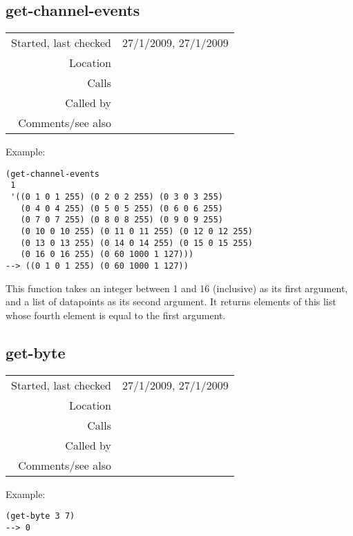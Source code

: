 \subsection*{get-channel-events}\label{fun:get-channel-events}

\vspace{0.3cm}
\begin{tabular}{r|p{8cm}}
Started, last checked & 27/1/2009, 27/1/2009 \\
Location & \nameref{sec:MIDI-export} \\
Calls & \\
Called by & \nameref{fun:create-midi-tracks} \\
Comments/see also &
\end{tabular}

\vspace{0.5cm}
\noindent Example:
\begin{verbatim}
(get-channel-events
 1
 '((0 1 0 1 255) (0 2 0 2 255) (0 3 0 3 255)
   (0 4 0 4 255) (0 5 0 5 255) (0 6 0 6 255) 
   (0 7 0 7 255) (0 8 0 8 255) (0 9 0 9 255)
   (0 10 0 10 255) (0 11 0 11 255) (0 12 0 12 255)
   (0 13 0 13 255) (0 14 0 14 255) (0 15 0 15 255)
   (0 16 0 16 255) (0 60 1000 1 127)))
--> ((0 1 0 1 255) (0 60 1000 1 127))
\end{verbatim}

\noindent This function takes an integer between 1 and
16 (inclusive) as its first argument, and a list of
datapoints as its second argument. It returns elements
of this list whose fourth element is equal to the
first argument.


\subsection*{get-byte}\label{fun:get-byte}

\vspace{0.3cm}
\begin{tabular}{r|p{8cm}}
Started, last checked & 27/1/2009, 27/1/2009 \\
Location & \nameref{sec:MIDI-export} \\
Calls & \\
Called by & \nameref{fun:split-bytes} \\
Comments/see also &
\end{tabular}

\vspace{0.5cm}
\noindent Example:
\begin{verbatim}
(get-byte 3 7)
--> 0
\end{verbatim}

